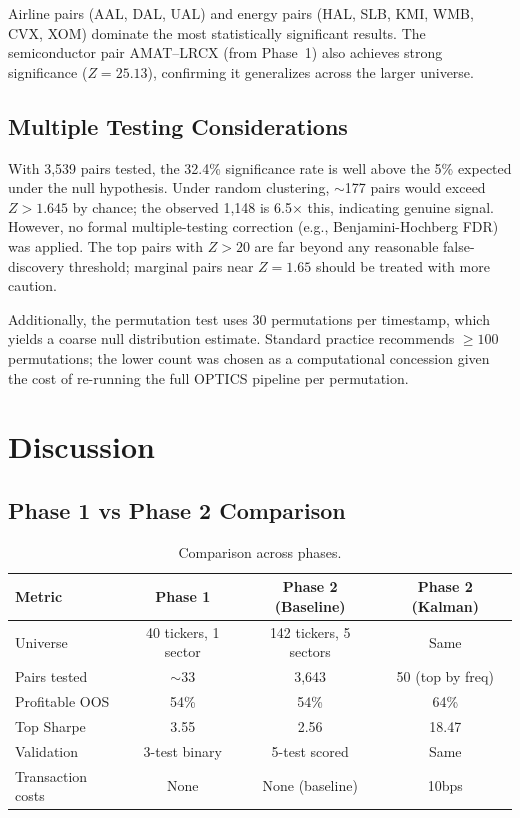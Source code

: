 \documentclass[11pt, a4paper]{article}
\begin{document}
Airline pairs (AAL, DAL, UAL) and energy pairs (HAL, SLB, KMI, WMB, CVX, XOM) dominate the most statistically significant results. The semiconductor pair AMAT--LRCX (from Phase~1) also achieves strong significance ($Z = 25.13$), confirming it generalizes across the larger universe.

\subsection{Multiple Testing Considerations}

With 3,539 pairs tested, the 32.4\% significance rate is well above the 5\% expected under the null hypothesis. Under random clustering, $\sim$177 pairs would exceed $Z > 1.645$ by chance; the observed 1,148 is 6.5$\times$ this, indicating genuine signal. However, no formal multiple-testing correction (e.g., Benjamini-Hochberg FDR) was applied. The top pairs with $Z > 20$ are far beyond any reasonable false-discovery threshold; marginal pairs near $Z = 1.65$ should be treated with more caution.

Additionally, the permutation test uses 30 permutations per timestamp, which yields a coarse null distribution estimate. Standard practice recommends $\geq 100$ permutations; the lower count was chosen as a computational concession given the cost of re-running the full OPTICS pipeline per permutation.

\section{Discussion}

\subsection{Phase 1 vs Phase 2 Comparison}

\begin{table}[H]
\centering
\caption{Comparison across phases.}
\begin{tabular}{@{}lccc@{}}
\toprule
\textbf{Metric} & \textbf{Phase 1} & \textbf{Phase 2 (Baseline)} & \textbf{Phase 2 (Kalman)} \\
\midrule
Universe        & 40 tickers, 1 sector & 142 tickers, 5 sectors & Same \\
Pairs tested    & $\sim$33             & 3,643                  & 50 (top by freq) \\
Profitable OOS  & 54\%                 & 54\%                   & 64\% \\
Top Sharpe      & 3.55                 & 2.56                   & 18.47 \\
Validation      & 3-test binary        & 5-test scored          & Same \\
Transaction costs & None               & None (baseline)        & 10bps \\
\bottomrule
\end{tabular}
\label{tab:phase-comparison}
\end{table}
\end{document}
